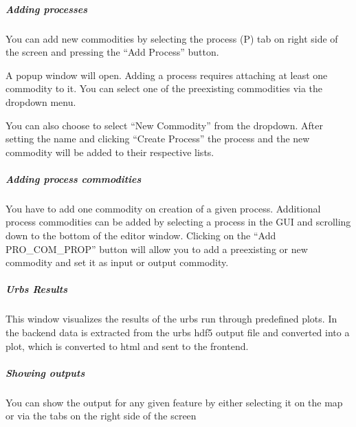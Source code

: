 \documentclass[letterpaper,10pt,english]{sphinxmanual}
\begin{document}
\subparagraph{Adding processes}
\label{\detokenize{docs_gui/usage/urbs_setup:adding-processes}}
\begin{DUlineblock}{0em}
\item[] You can add new commodities by selecting the process (P) tab on right side of the screen and pressing the “Add Process” button.
\item[] A popup window will open. Adding a process requires attaching at least one commodity to it. You can select one of the pre\sphinxhyphen{}existing commodities via the dropdown menu.
\item[] You can also choose to select “New Commodity” from the dropdown. After setting the name and clicking “Create Process” the process and the new commodity will be added to their
respective lists.
\end{DUlineblock}


\subparagraph{Adding process commodities}
\label{\detokenize{docs_gui/usage/urbs_setup:adding-process-commodities}}
\begin{DUlineblock}{0em}
\item[] You have to add one commodity on creation of a given process. Additional process commodities can be added by selecting a process in the GUI and scrolling down to the
bottom of the editor window. Clicking on the “Add PRO\_COM\_PROP” button will allow you to add a preexisting or new commodity and set it as input or output commodity.
\end{DUlineblock}

\sphinxstepscope


\subparagraph{Urbs Results}
\label{\detokenize{docs_gui/usage/urbs_results:urbs-results}}\label{\detokenize{docs_gui/usage/urbs_results::doc}}
\begin{DUlineblock}{0em}
\item[] This window visualizes the results of the urbs run through predefined plots. In the backend data is extracted from the urbs hdf5 output file and
converted into a plot, which is converted to html and sent to the frontend.
\end{DUlineblock}


\subparagraph{Showing outputs}
\label{\detokenize{docs_gui/usage/urbs_results:showing-outputs}}
\begin{DUlineblock}{0em}
\item[] You can show the output for any given feature by either selecting it on the map or via the tabs on the right side of the screen
\end{DUlineblock}
\end{document}
